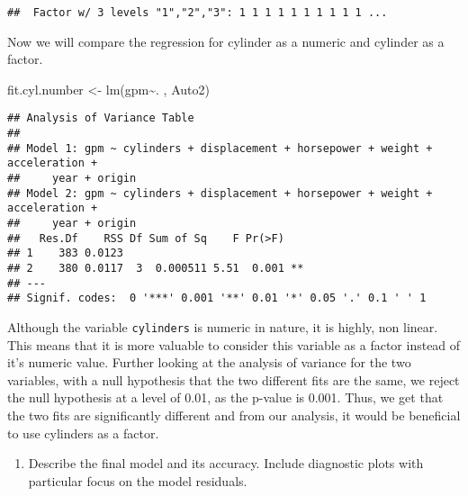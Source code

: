 \documentclass[
]{article}
\newenvironment{Shaded}{\begin{snugshade}}{\end{snugshade}}
\newcommand{\FunctionTok}[1]{\textcolor[rgb]{0.00,0.00,0.00}{#1}}
\newcommand{\NormalTok}[1]{#1}
\newcommand{\OtherTok}[1]{\textcolor[rgb]{0.56,0.35,0.01}{#1}}
\newcommand{\SpecialCharTok}[1]{\textcolor[rgb]{0.00,0.00,0.00}{#1}}
\providecommand{\tightlist}{%
  \setlength{\itemsep}{0pt}\setlength{\parskip}{0pt}}
\begin{document}
\begin{verbatim}
##  Factor w/ 3 levels "1","2","3": 1 1 1 1 1 1 1 1 1 1 ...
\end{verbatim}

Now we will compare the regression for cylinder as a numeric and
cylinder as a factor.

\begin{Shaded}
\begin{Highlighting}[]
\NormalTok{fit.cyl.number }\OtherTok{\textless{}{-}} \FunctionTok{lm}\NormalTok{(gpm}\SpecialCharTok{\textasciitilde{}}\NormalTok{. , Auto2)}
\end{Highlighting}
\end{Shaded}

\begin{Shaded}
\end{Shaded}

\begin{verbatim}
## Analysis of Variance Table
## 
## Model 1: gpm ~ cylinders + displacement + horsepower + weight + acceleration + 
##     year + origin
## Model 2: gpm ~ cylinders + displacement + horsepower + weight + acceleration + 
##     year + origin
##   Res.Df    RSS Df Sum of Sq    F Pr(>F)   
## 1    383 0.0123                            
## 2    380 0.0117  3  0.000511 5.51  0.001 **
## ---
## Signif. codes:  0 '***' 0.001 '**' 0.01 '*' 0.05 '.' 0.1 ' ' 1
\end{verbatim}

Although the variable \texttt{cylinders} is numeric in nature, it is
highly, non linear. This means that it is more valuable to consider this
variable as a factor instead of it's numeric value. Further looking at
the analysis of variance for the two variables, with a null hypothesis
that the two different fits are the same, we reject the null hypothesis
at a level of 0.01, as the p-value is 0.001. Thus, we get that the two
fits are significantly different and from our analysis, it would be
beneficial to use cylinders as a factor.

\begin{enumerate}
\def\labelenumi{\arabic{enumi})}
\setcounter{enumi}{1}
\tightlist
\item
  Describe the final model and its accuracy. Include diagnostic plots
  with particular focus on the model residuals.
\end{enumerate}
\end{document}
